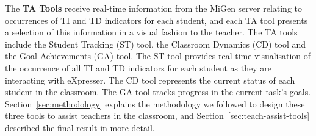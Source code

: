 The {\bf TA Tools}
receive real-time information from the MiGen server relating to
occurrences of TI and TD indicators for each student, and each TA tool
presents a selection of this information in a visual fashion to the
teacher. The TA tools include the Student Tracking (ST) tool, the
Classroom Dynamics (CD) tool and the Goal Achievements (GA) tool. The
ST tool provides real-time visualisation of the occurrence of all TI
and TD indicators for each student as they are interacting with
eXpresser. 
The CD tool represents the current status of each student in the
classroom. 
% 
The GA tool tracks progress in the current task's goals. 
Section~\ref{sec:methodology} explains the methodology we followed to
design these three tools to assist teachers in the classroom, and
Section~\ref{sec:teach-assist-tools} described the final result in
more detail. 

